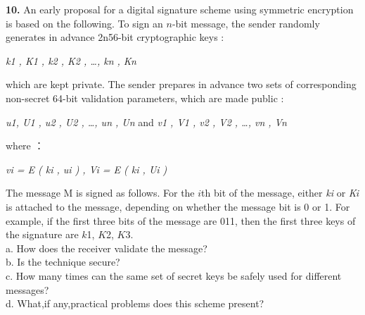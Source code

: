 \documentclass[paper=a4, fontsize=11pt]{scrartcl} %
\numberwithin{equation}{section} %
\numberwithin{figure}{section} %
\numberwithin{table}{section} %
\begin{document}
\textbf{10.} An early proposal for a digital signature scheme using symmetric encryption is based on the following. To sign an $n$-bit message, the sender randomly generates in advance 2n56-bit cryptographic keys :\\
\centerline{\emph{ k1 , K1 , k2 , K2 , \ldots , kn , Kn }}
which are kept private. The sender prepares in advance two sets of corresponding non-secret 64-bit validation parameters, which are made public :\\
\centerline{\emph{ u1, U1 , u2 , U2 , \ldots , un , Un }  and  \emph{ v1 , V1 , v2 , V2 , \ldots , vn , Vn }}
where ：\\
\centerline{\emph{ vi =  E ( ki , ui ) ,  Vi = E ( ki , Ui )}}
The message M is signed as follows. For the $i$th bit of the message, either \emph{ki} or \emph{Ki} is attached to the message, depending on whether the message bit is 0 or 1. For example, if the first three bits of the message are 011, then the first three keys of the signature are $k$1, $K$2, $K$3. \\

a.  How does the receiver validate the message?\\
b.  Is the technique secure?\\
c.  How many times can the same set of secret keys be safely used for different messages?\\
d.  What,if any,practical problems does this scheme present?\\
\end{document}
